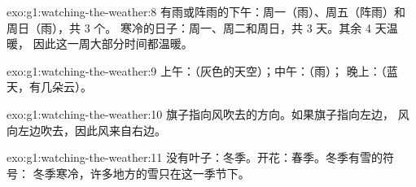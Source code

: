 \begin{solution}{exo:g1:watching-the-weather:8}
有雨或阵雨的下午：周一（雨）、周五（阵雨）和周日（雨），共 3 个。
寒冷的日子：周一、周二和周日，共 3 天。其余 4 天温暖，
因此这一周大部分时间都温暖。
\end{solution}

\begin{solution}{exo:g1:watching-the-weather:9}
上午：（灰色的天空）；中午：（雨）；
晚上：（蓝天，有几朵云）。
\end{solution}

\begin{solution}{exo:g1:watching-the-weather:10}
旗子指向风吹去的方向。如果旗子指向左边，
风向左边吹去，因此风来自右边。
\end{solution}

\begin{solution}{exo:g1:watching-the-weather:11}
没有叶子：冬季。开花：春季。冬季有雪的符号：
冬季寒冷，许多地方的雪只在这一季节下。
\end{solution}
